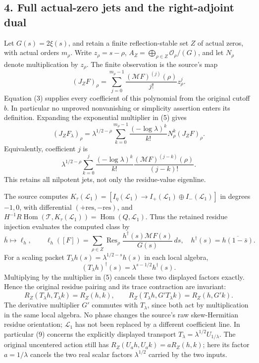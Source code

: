 \subsection{4. Full actual-zero jets and the right-adjoint
dual}\label{TranscriptStage:proof09:full-actual-zero-jets-and-the-right-adjoint-dual}

Let \(G(s)=2\xi(s)\), and retain a finite reflection-stable set \(Z\) of
actual zeros, with actual orders \(m_\rho\). Write \(z_\rho=s-\rho\),
\(A_Z=\bigoplus_{\rho\in Z}\mathcal O_\rho/(G)\), and let \(N_\rho\)
denote multiplication by \(z_\rho\). The finite observation is the
source's map \[
(J_ZF)_\rho=\sum_{j=0}^{m_\rho-1}\frac{(\mathcal MF)^{(j)}(\rho)}{j!}z_\rho^j.
\] Equation (3) supplies every coefficient of this polynomial from the
original cutoff \(b\). In particular no unproved nonvanishing or
simplicity assertion enters its definition. Expanding the exponential
multiplier in (5) gives \[
\boxed{(J_ZF_\lambda)_\rho=\lambda^{1/2-\rho}
\sum_{k=0}^{m_\rho-1}\frac{(-\log\lambda)^k}{k!}N_\rho^k(J_ZF)_\rho.}
\tag{7}
\] Equivalently, coefficient \(j\) is \[
\lambda^{1/2-\rho}\sum_{k=0}^j
\frac{(-\log\lambda)^k}{k!}
\frac{(\mathcal MF)^{(j-k)}(\rho)}{(j-k)!}.
\] This retains all nilpotent jets, not only the residue-value
eigenline.

The source computes
\(K_\tau(\mathcal L_1)=[I_\eta(\mathcal L_1)\to I_+(\mathcal L_1)\oplus I_-(\mathcal L_1)]\)
in degrees \(-1,0\), with differential
\((+\mathrm{res},-\mathrm{res})\), and
\(H^{-1}R\operatorname{Hom}(\mathcal T,K_\tau(\mathcal L_1))=\operatorname{Hom}(Q,\mathcal L_1)\).
Thus the retained residue injection evaluates the computed class by \[
\overline h\longmapsto\ell_h,\qquad
\ell_h([F])=\sum_{\rho\in Z}\operatorname{Res}_\rho
\frac{h^\dagger(s)\mathcal MF(s)}{G(s)}\,ds,
\quad h^\dagger(s)=\overline{h(1-\bar s)}.
\tag{8}
\] For a scaling packet \(T_\lambda h(s)=\lambda^{1/2-s}h(s)\) in each
local algebra, \[
(T_\lambda h)^\dagger(s)=\lambda^{s-1/2}h^\dagger(s).
\] Multiplying by the multiplier in (5) cancels these two displayed
factors exactly. Hence the original residue pairing and its trace
contraction are invariant: \[
R_Z(T_\lambda h,T_\lambda k)=R_Z(h,k),\qquad
R_Z(T_\lambda h,G'T_\lambda k)=R_Z(h,G'k).
\tag{9}
\] The derivative multiplier \(G'\) commutes with \(T_\lambda\), since
both act by multiplication in the same local algebra. No phase changes
the source's raw skew-Hermitian residue orientation; \(\mathcal L_1\)
has not been replaced by a different coefficient line. In particular (9)
concerns the explicitly displayed transport
\(T_\lambda=\lambda^{1/2}U_{1/\lambda}\). The original uncentered action
still has \(R_Z(U_ah,U_ak)=aR_Z(h,k)\); here its factor \(a=1/\lambda\)
cancels the two real scalar factors \(\lambda^{1/2}\) carried by the two
inputs.

